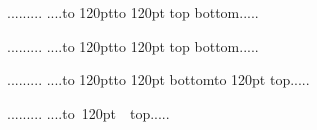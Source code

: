 .........
....\hbox to 120pt{\vbox to 120pt{
\hbox{top}
\vfil
\hbox{bottom}}}.....

.........
....\hbox to 120pt{\vtop to 120pt{
\hbox{top}
\vfil
\hbox{bottom}}}.....

.........
....\hbox to 120pt{\vtop to 120pt{
\vfil
\hbox{bottom}}\hskip-120pt\vbox to 120pt {
\hbox{top}}}.....

.........
....\hbox{\vbox to 120pt {
\hbox{top}}}.....
\bye



